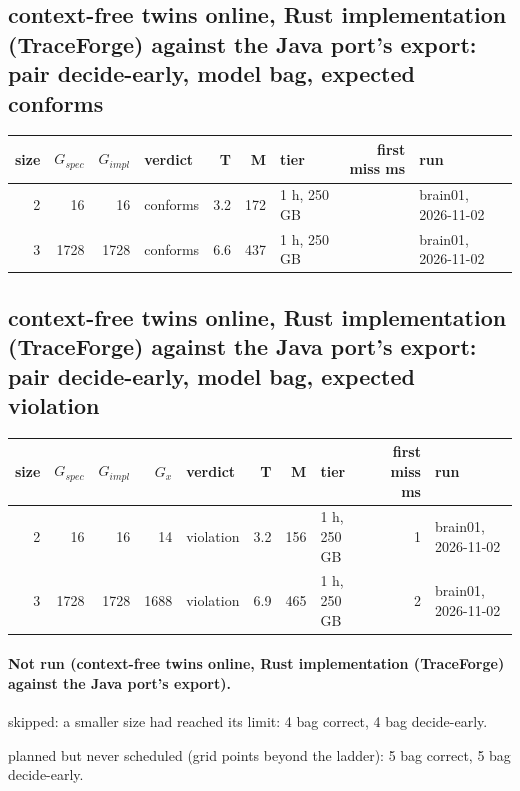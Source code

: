 \documentclass[10pt]{article}
\begin{document}
\subsection*{context-free twins online, Rust implementation (TraceForge) against the Java port's export: pair \textsf{decide-early}, model bag, expected conforms}
\begin{longtable}{@{}rrrlrrlrl@{}}
\toprule
size & $G_{\mathit{spec}}$ & $G_{\mathit{impl}}$ & verdict & T & M & tier & first miss ms & run \\
\midrule
\endhead
\color{red} 2 & 16 & 16 & conforms & 3.2 & 172 & 1 h, 250 GB &  & brain01, 2026-11-02 \\
\color{red} 3 & 1728 & 1728 & conforms & 6.6 & 437 & 1 h, 250 GB &  & brain01, 2026-11-02 \\
\bottomrule
\end{longtable}
\subsection*{context-free twins online, Rust implementation (TraceForge) against the Java port's export: pair \textsf{decide-early}, model bag, expected violation}
\begin{longtable}{@{}rrrrlrrlrl@{}}
\toprule
size & $G_{\mathit{spec}}$ & $G_{\mathit{impl}}$ & $G_x$ & verdict & T & M & tier & first miss ms & run \\
\midrule
\endhead
\color{red} 2 & 16 & 16 & 14 & violation & 3.2 & 156 & 1 h, 250 GB & 1 & brain01, 2026-11-02 \\
\color{red} 3 & 1728 & 1728 & 1688 & violation & 6.9 & 465 & 1 h, 250 GB & 2 & brain01, 2026-11-02 \\
\bottomrule
\end{longtable}
\paragraph{Not run (context-free twins online, Rust implementation (TraceForge) against the Java port's export).}
skipped: a smaller size had reached its limit: 4 bag correct, 4 bag decide-early.\par
planned but never scheduled (grid points beyond the ladder): 5 bag correct, 5 bag decide-early.\par
\end{document}
